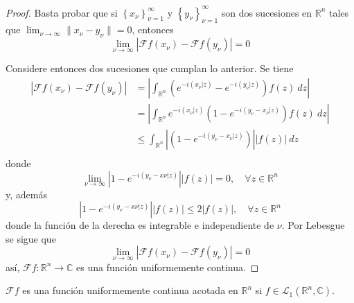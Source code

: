 \documentclass[12pt]{report}
\theoremstyle{largebreak}
\renewcommand{\leq}{\ensuremath{\leqslant}}
\newcommand\abs[1]{\ensuremath{\left|#1\right|}}
\newcommand\cf[3]{\ensuremath{#1:#2\rightarrow#3}}
\newcommand\norm[1]{\ensuremath{\|#1\|}}
\newcommand\pint[2]{\ensuremath{\left(#1\big| #2\right)}}
\newcommand{\fou}[1]{\ensuremath{\mathcal{F}#1}}
\begin{document}
    \begin{proof}
        Basta probar que si $\left\{x_\nu\right\}_{ \nu=1}^\infty$ y $\left\{y_\nu \right\}_{ \nu=1}^\infty$ son dos sucesiones en $\mathbb{R}^n$ tales que $\lim_{ \nu\rightarrow\infty}\norm{x_\nu-y_\nu}=0$, entonces
        \begin{equation*}
            \lim_{\nu\rightarrow\infty}\abs{\fou{f}(x_\nu)-\fou{f}(y_\nu)}=0
        \end{equation*}

        Considere entonces dos sucesiones que cumplan lo anterior. Se tiene
        \begin{equation*}
            \begin{split}
                \abs{\fou{f}(x_\nu)-\fou{f}(y_\nu)}&=\abs{\int_{\mathbb{R}^n}\left(e^{ -i\pint{x_\nu}{z}}-e^{ -i\pint{y_\nu}{z}} \right)f(z)\:dz}\\
                &=\abs{\int_{\mathbb{R}^n}e^{ -i\pint{x_\nu}{z}}\left(1-e^{ -i\pint{y_\nu-x_\nu}{z}} \right)f(z)\:dz}\\
                &\leq\int_{\mathbb{R}^n}\abs{\left(1-e^{ -i\pint{y_\nu-x_\nu}{z}} \right)}\abs{f(z)}\:dz\\
            \end{split}
        \end{equation*}
        donde
        \begin{equation*}
            \lim_{\nu\rightarrow\infty}\abs{1-e^{-i\pint{y_\nu-x\nu}{z}}}\abs{f(z)}=0,\quad\forall z\in\mathbb{R}^n
        \end{equation*}
        y, además
        \begin{equation*}
            \abs{1-e^{-i\pint{y_\nu-x\nu}{z}}}\abs{f(z)}\leq2\abs{f(z)},\quad\forall z\in\mathbb{R}^n
        \end{equation*}
        donde la función de la derecha es integrable e independiente de $\nu$. Por Lebesgue se sigue que
        \begin{equation*}
            \lim_{\nu\rightarrow\infty}\abs{\fou{f}(x_\nu)-\fou{f}(y_\nu)}=0
        \end{equation*}
        así, $\cf{\fou{f}}{\mathbb{R}^n}{\mathbb{C}}$ es una función uniformemente continua.
    \end{proof}

    \begin{obs}
        $\fou{f}$ es una función uniformemente continua acotada en $\mathbb{R}^n$ si $f\in\mathcal{L}_1(\mathbb{R}^n,\mathbb{C})$.
    \end{obs}
\end{document}
